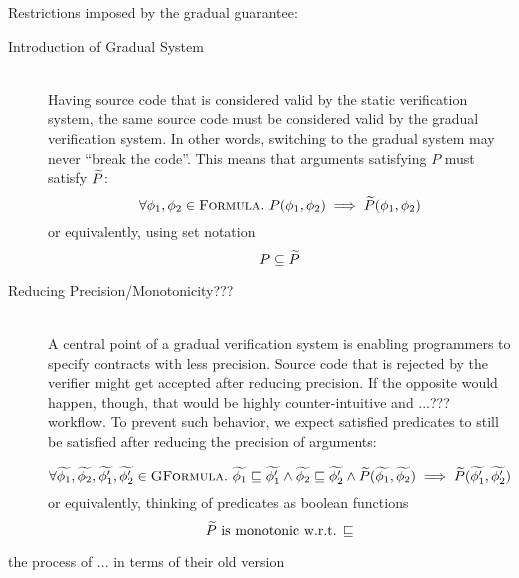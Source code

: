 Restrictions imposed by the gradual guarantee:
\begin{description}
    \item[Introduction of Gradual System]~\\
    Having source code that is considered valid by the static verification system, the same source code must be considered valid by the gradual verification system.
    In other words, switching to the gradual system may never “break the code”.
    This means that arguments satisfying $P$ must satisfy $\widetilde{P}$:
    \begin{displaymath}
    \forall \phi_1, \phi_2 \in \textsc{Formula}.~ P(\phi_1, \phi_2) \implies \widetilde{P}(\phi_1, \phi_2)
    \end{displaymath}
    or equivalently, using set notation
    \begin{displaymath}
    P \subseteq \widetilde{P}
    \end{displaymath}
    
    \item[Reducing Precision/Monotonicity???]~\\
    A central point of a gradual verification system is enabling programmers to specify contracts with less precision.
    Source code that is rejected by the verifier might get accepted after reducing precision.
    If the opposite would happen, though, that would be highly counter-intuitive and ...??? workflow.
    To prevent such behavior, we expect satisfied predicates to still be satisfied after reducing the precision of arguments:
    
    \begin{displaymath}
    \forall \widetilde{\phi_1}, \widetilde{\phi_2}, \widetilde{\phi_1'}, \widetilde{\phi_2'} \in \textsc{GFormula}.~ \widetilde{\phi_1} \sqsubseteq \widetilde{\phi_1'} \wedge \widetilde{\phi_2} \sqsubseteq \widetilde{\phi_2'} \wedge \widetilde{P}(\widetilde{\phi_1}, \widetilde{\phi_2}) \implies \widetilde{P}(\widetilde{\phi_1'}, \widetilde{\phi_2'})
    \end{displaymath}
    or equivalently, thinking of predicates as boolean functions
    \begin{displaymath}
    \widetilde{P}  \text{ is monotonic w.r.t. $\sqsubseteq$}
    \end{displaymath}
\end{description}

\begin{definition}
    the process of ... in terms of their old version
\end{definition}



